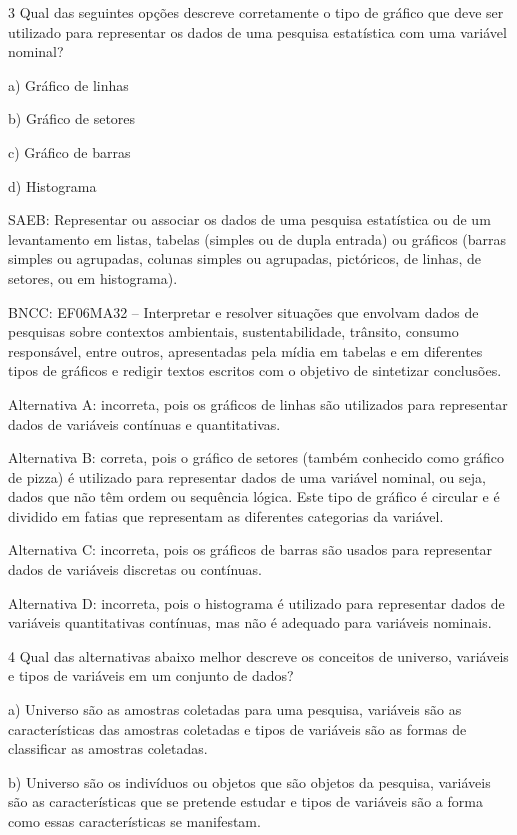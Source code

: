 \num{3}  Qual das seguintes opções descreve corretamente o tipo de gráfico que
deve ser utilizado para representar os dados de uma pesquisa estatística
com uma variável nominal?

a) Gráfico de linhas

b) Gráfico de setores

c) Gráfico de barras

d) Histograma

SAEB: Representar ou associar os dados de uma pesquisa estatística ou de
um levantamento em listas, tabelas (simples ou de dupla entrada) ou
gráficos (barras simples ou agrupadas, colunas simples ou agrupadas,
pictóricos, de linhas, de setores, ou em histograma).

BNCC: EF06MA32 -- Interpretar e resolver situações que envolvam dados de
pesquisas sobre contextos ambientais, sustentabilidade, trânsito,
consumo responsável, entre outros, apresentadas pela mídia em tabelas e
em diferentes tipos de gráficos e redigir textos escritos com o objetivo
de sintetizar conclusões.

Alternativa A: incorreta, pois os gráficos de linhas são utilizados para
representar dados de variáveis contínuas e quantitativas.

Alternativa B: correta, pois o gráfico de setores (também conhecido como
gráfico de pizza) é utilizado para representar dados de uma variável
nominal, ou seja, dados que não têm ordem ou sequência lógica. Este tipo
de gráfico é circular e é dividido em fatias que representam as
diferentes categorias da variável.

Alternativa C: incorreta, pois os gráficos de barras são usados para
representar dados de variáveis discretas ou contínuas.

Alternativa D: incorreta, pois o histograma é utilizado para representar
dados de variáveis quantitativas contínuas, mas não é adequado para
variáveis nominais.

\num{4}  Qual das alternativas abaixo melhor descreve os conceitos de
universo, variáveis e tipos de variáveis em um conjunto de dados?

a) Universo são as amostras coletadas para uma pesquisa, variáveis são
as características das amostras coletadas e tipos de variáveis são as
formas de classificar as amostras coletadas.

b) Universo são os indivíduos ou objetos que são objetos da pesquisa,
variáveis são as características que se pretende estudar e tipos de
variáveis são a forma como essas características se manifestam.

